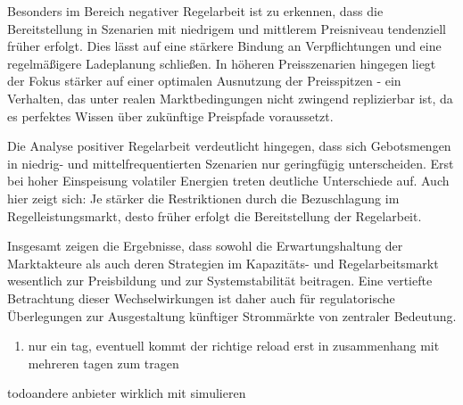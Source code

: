 Besonders im Bereich negativer Regelarbeit  ist zu erkennen, dass die Bereitstellung in Szenarien mit niedrigem und mittlerem Preisniveau
tendenziell früher erfolgt.  Dies lässt auf eine stärkere Bindung an Verpflichtungen und eine regelmäßigere Ladeplanung schließen.
In höheren Preisszenarien hingegen liegt der Fokus stärker auf einer optimalen Ausnutzung der Preisspitzen - ein Verhalten, das unter realen Marktbedingungen
nicht zwingend replizierbar ist, da es perfektes Wissen über zukünftige Preispfade voraussetzt.

Die Analyse positiver Regelarbeit verdeutlicht hingegen, dass sich Gebotsmengen in niedrig- und mittelfrequentierten Szenarien
nur geringfügig unterscheiden. Erst bei hoher Einspeisung volatiler Energien treten deutliche Unterschiede auf. Auch hier zeigt
sich: Je stärker die Restriktionen durch die Bezuschlagung im Regelleistungsmarkt, desto früher erfolgt die Bereitstellung der Regelarbeit.

Insgesamt zeigen die Ergebnisse, dass sowohl die Erwartungshaltung der Marktakteure als auch deren Strategien im Kapazitäts-
und Regelarbeitsmarkt wesentlich zur Preisbildung und zur Systemstabilität beitragen. Eine vertiefte Betrachtung
dieser Wechselwirkungen ist daher auch für regulatorische Überlegungen zur Ausgestaltung künftiger Strommärkte von zentraler Bedeutung.

\begin{enumerate}
	\item nur ein tag, eventuell kommt der richtige reload erst in zusammenhang mit mehreren tagen zum tragen
\end{enumerate}

todo{andere anbieter wirklich mit simulieren}